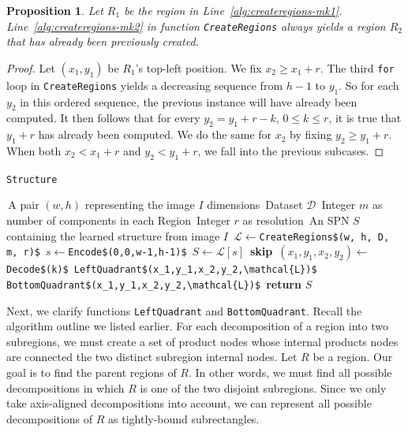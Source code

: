 \documentclass{amsart}
\theoremstyle{plain}
\newcounter{dummy-def}\numberwithin{dummy-def}{section}
\newcounter{dummy-thm}\numberwithin{dummy-thm}{section}
\newcounter{dummy-prop}\numberwithin{dummy-prop}{section}
\newtheorem{proposition}[dummy-prop]{Proposition}
\newcounter{dummy-corollary}\numberwithin{dummy-corollary}{section}
\newcounter{dummy-lemma}\numberwithin{dummy-lemma}{section}
\newcounter{dummy-ex}\numberwithin{dummy-ex}{section}
\newcounter{dummy-eg}\numberwithin{dummy-eg}{section}
\numberwithin{equation}{section}
\newcommand{\code}[1]{\lstinline[mathescape=true]{#1}}
\newcommand{\mcode}[1]{\lstinline[mathescape]!#1!}
\begin{document}
\begin{proposition} Let $R_1$ be the region in Line~\ref{alg:createregions-mk1}.
  Line~\ref{alg:createregions-mk2} in function \code{CreateRegions} always yields
  a region $R_2$ that has already been previously created.
\end{proposition}
\begin{proof}
  Let $(x_1,y_1)$ be $R_1$'s top-left position. We fix $x_2\geq x_1+r$. The third \code{for} loop
  in \code{CreateRegions} yields a decreasing sequence from $h-1$ to $y_1$. So for each $y_2$ in
  this ordered sequence, the previous instance will have already been computed. It then follows
  that for every $y_2=y_1+r-k$, $0\leq k\leq r$, it is true that $y_1+r$ has already been computed.
  We do the same for $x_2$ by fixing $y_2\geq y_1+r$. When both $x_2<x_1+r$ and $y_2<y_1+r$, we
  fall into the previous subcases.
\end{proof}

\begin{algorithm}[h]
  \caption{\code{Structure}}\label{alg:structure}
  \begin{algorithmic}[1]
    \Require\,A pair $(w,h)$ representing the image $I$ dimensions
    \Require\,Dataset $\mathcal{D}$
    \Require\,Integer $m$ as number of components in each Region
    \Require\,Integer $r$ as resolution
    \Ensure\,An SPN $S$ containing the learned structure from image $I$
    \State\,$\mathcal{L}\gets$\mcode{CreateRegions$(w, h, D, m, r)$}
    \State\,$s\gets$\mcode{Encode$(0,0,w-1,h-1)$}
    \State\,$S\gets\mathcal{L}[s]$
        \State\,\textbf{skip}
      \EndIf%
      \State\,$(x_1,y_1,x_2,y_2)\gets$ \mcode{Decode$(k)$}
      \State\,\mcode{LeftQuadrant$(x_1,y_1,x_2,y_2,\mathcal{L})$}
      \State\,\mcode{BottomQuadrant$(x_1,y_1,x_2,y_2,\mathcal{L})$}
    \EndFor%
    \State\,\textbf{return} $S$
  \end{algorithmic}
\end{algorithm}

Next, we clarify functions \mcode{LeftQuadrant} and \mcode{BottomQuadrant}. Recall the algorithm
outline we listed earlier. For each decomposition of a region into two subregions, we must create a
set of product nodes whose internal products nodes are connected the two distinct subregion
internal nodes. Let $R$ be a region. Our goal is to find the parent regions of $R$. In other words,
we must find all possible decompositions in which $R$ is one of the two disjoint subregions. Since
we only take axis-aligned decompositions into account, we can represent all possible decompositions
of $R$ as tightly-bound subrectangles.
\end{document}
